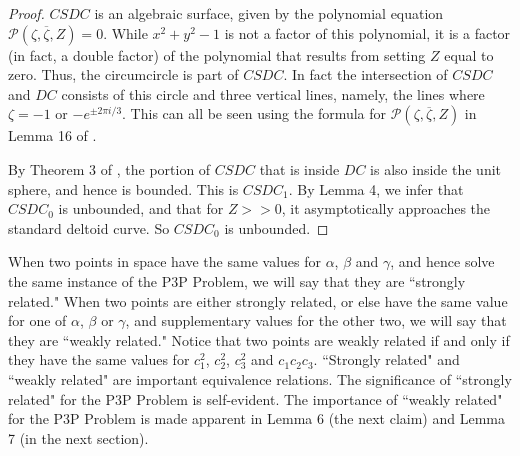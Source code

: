 \documentclass[a4paper, twoside]{article}
\begin{document}
\begin{proof}

$CSDC$ is an algebraic surface, given by the polynomial equation $\mathcal{P}(\zeta, \overline{\zeta}, Z) = 0$. While $x^2+y^2-1$ is not a factor of this polynomial, it is a factor (in fact, a double factor) of the polynomial that results from setting $Z$ equal to zero. Thus, the circumcircle is part of $CSDC$. In fact the intersection of $CSDC$ and $DC$ consists of this circle and three vertical lines, namely, the lines where $\zeta = -1$ or $- e^{\pm 2\pi i/3}$. This can all be seen using the formula for $\mathcal{P}(\zeta, \overline{\zeta}, Z)$ in Lemma 16 of \cite{RW}. 

By Theorem 3 of \cite{RW}, the portion of $CSDC$ that is inside $DC$ is also inside the unit sphere, and hence is bounded. This is $CSDC_1$. By Lemma 4, we infer that $CSDC_0$ is unbounded, and that for $Z >> 0$, it asymptotically approaches the standard deltoid curve. So $CSDC_0$ is unbounded.   

\end{proof} 

\vspace{2mm}

When two points in space have the same values for $\alpha$, $\beta$ and $\gamma$, and hence solve the same instance of the P3P Problem, we will say that they are ``strongly related." When two points are either strongly related, or else have the same value for one of $\alpha$, $\beta$ or $\gamma$, and supplementary values for the other two, we will say that they are ``weakly related." Notice that two points are weakly related if and only if they have the same values for $c_1^2$,  $c_2^2$,  $c_3^2$ and $c_1 c_2 c_3$. ``Strongly related" and ``weakly related" are important equivalence relations. The significance of ``strongly related" for the P3P Problem is self-evident. The importance of ``weakly related" for the P3P Problem is made apparent in Lemma 6 (the next claim) and Lemma 7 (in the next section). 

\vspace{2mm}
\end{document}
